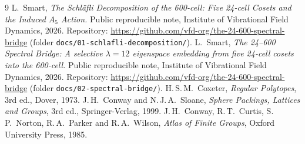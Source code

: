 \documentclass[11pt]{article}
\theoremstyle{definition}
\begin{document}
\begin{thebibliography}{9}
L.~Smart, \emph{The Schl\"afli Decomposition of the 600-cell:
Five 24-cell Cosets and the Induced $A_5$ Action.}
Public reproducible note, Institute of Vibrational Field Dynamics,
2026.  Repository:
\url{https://github.com/vfd-org/the-24-600-spectral-bridge}
(folder \texttt{docs/01-schlafli-decomposition/}).
L.~Smart, \emph{The 24--600 Spectral Bridge: A selective $\lambda=12$
eigenspace embedding from five 24-cell cosets into the 600-cell.}
Public reproducible note, Institute of Vibrational Field Dynamics,
2026.  Repository:
\url{https://github.com/vfd-org/the-24-600-spectral-bridge}
(folder \texttt{docs/02-spectral-bridge/}).
H.\,S.\,M.~Coxeter, \emph{Regular Polytopes}, 3rd ed., Dover, 1973.
J.\,H.~Conway and N.\,J.\,A.~Sloane, \emph{Sphere Packings, Lattices
and Groups}, 3rd ed., Springer-Verlag, 1999.
J.\,H.~Conway, R.\,T.~Curtis, S.\,P.~Norton, R.\,A.~Parker and
R.\,A.~Wilson, \emph{Atlas of Finite Groups}, Oxford University
Press, 1985.
\end{thebibliography}
\end{document}
